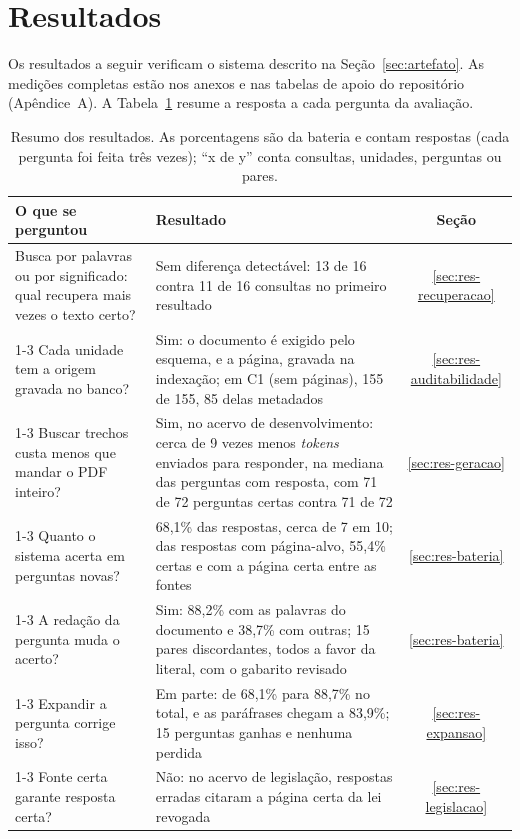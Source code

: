 \documentclass[12pt]{article}
\newcommand{\fonte}{\par\vspace{3pt}{\footnotesize Fonte: o autor.}\par}
\begin{document}
\section{Resultados}
\label{sec:resultados}

Os resultados a seguir verificam o sistema descrito na Seção~\ref{sec:artefato}. As medições completas estão nos anexos e nas tabelas de apoio do repositório (Apêndice~A). A Tabela~\ref{tab:resumo-resultados} resume a resposta a cada pergunta da avaliação.

\begin{table}[!htbp]
\centering
\caption{Resumo dos resultados. As porcentagens são da bateria e contam respostas (cada pergunta foi feita três vezes); ``x de y'' conta consultas, unidades, perguntas ou pares.}
\label{tab:resumo-resultados}
\small
\begin{tabular}{p{4.2cm}p{8.4cm}c}
\toprule
O que se perguntou & Resultado & Seção \\
\midrule
Busca por palavras ou por significado: qual recupera mais vezes o texto certo? & Sem diferença detectável: 13 de 16 contra 11 de 16 consultas no primeiro resultado & \ref{sec:res-recuperacao} \\
\cmidrule(lr){1-3}
Cada unidade tem a origem gravada no banco? & Sim: o documento é exigido pelo esquema, e a página, gravada na indexação; em C1 (sem páginas), 155 de 155, 85 delas metadados & \ref{sec:res-auditabilidade} \\
\cmidrule(lr){1-3}
Buscar trechos custa menos que mandar o PDF inteiro? & Sim, no acervo de desenvolvimento: cerca de 9 vezes menos \emph{tokens} enviados para responder, na mediana das perguntas com resposta, com 71 de 72 perguntas certas contra 71 de 72 & \ref{sec:res-geracao} \\
\cmidrule(lr){1-3}
Quanto o sistema acerta em perguntas novas? & 68,1\% das respostas, cerca de 7 em 10; das respostas com página-alvo, 55,4\% certas e com a página certa entre as fontes & \ref{sec:res-bateria} \\
\cmidrule(lr){1-3}
A redação da pergunta muda o acerto? & Sim: 88,2\% com as palavras do documento e 38,7\% com outras; 15 pares discordantes, todos a favor da literal, com o gabarito revisado & \ref{sec:res-bateria} \\
\cmidrule(lr){1-3}
Expandir a pergunta corrige isso? & Em parte: de 68,1\% para 88,7\% no total, e as paráfrases chegam a 83,9\%; 15 perguntas ganhas e nenhuma perdida & \ref{sec:res-expansao} \\
\cmidrule(lr){1-3}
Fonte certa garante resposta certa? & Não: no acervo de legislação, respostas erradas citaram a página certa da lei revogada & \ref{sec:res-legislacao} \\
\bottomrule
\end{tabular}
\fonte
\end{table}
\end{document}
